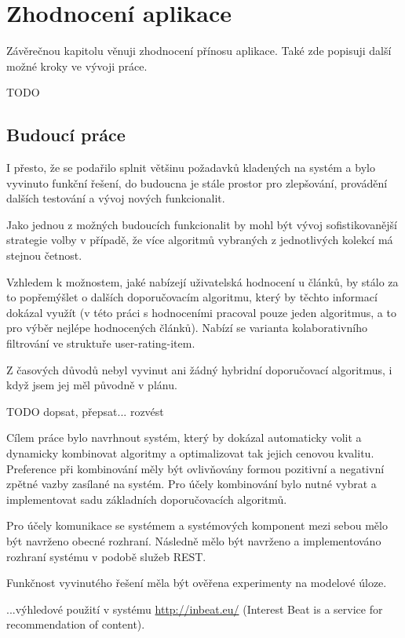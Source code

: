 \documentclass[thesis=M,czech]{FITthesis}[2014/05/07]
\begin{document}
\chapter{Zhodnocení aplikace}
\label{chap:futurework}	
Závěrečnou kapitolu věnuji zhodnocení přínosu aplikace. Také zde popisuji další možné kroky ve vývoji práce.

TODO

\section{Budoucí práce}
I přesto, že se podařilo splnit většinu požadavků kladených na systém a bylo vyvinuto funkční řešení, do budoucna je stále prostor pro zlepšování, provádění dalších testování a vývoj nových funkcionalit.

Jako jednou z možných budoucích funkcionalit by mohl být vývoj sofistikovanější strategie volby v případě, že více algoritmů vybraných z jednotlivých kolekcí má stejnou četnost.

Vzhledem k možnostem, jaké nabízejí uživatelská hodnocení u článků, by stálo za to popřemýšlet o dalších doporučovacím algoritmu, který by těchto informací dokázal využít (v této práci s hodnoceními pracoval pouze jeden algoritmus, a to pro výběr nejlépe hodnocených článků). Nabízí se varianta kolaborativního filtrování ve struktuře user-rating-item.

Z časových důvodů nebyl vyvinut ani žádný hybridní doporučovací algoritmus, i když jsem jej měl původně v plánu.

\begin{conclusion}
TODO dopsat, přepsat... rozvést

Cílem práce bylo navrhnout systém, který by dokázal automaticky volit a dynamicky kombinovat algoritmy a optimalizovat tak jejich cenovou kvalitu. Preference při kombinování měly být ovlivňovány formou pozitivní a negativní zpětné vazby zasílané na systém. Pro účely kombinování bylo nutné vybrat a implementovat sadu základních doporučovacích algoritmů. 

Pro účely komunikace se systémem a systémových komponent mezi sebou mělo být navrženo obecné rozhraní. Následně mělo být navrženo a implementováno rozhraní systému v podobě služeb REST.

Funkčnost vyvinutého řešení měla být ověřena experimenty na modelové úloze.

...výhledové použití v systému \url{http://inbeat.eu/} (Interest Beat is a service for recommendation of content). 
\end{conclusion}
\end{document}
